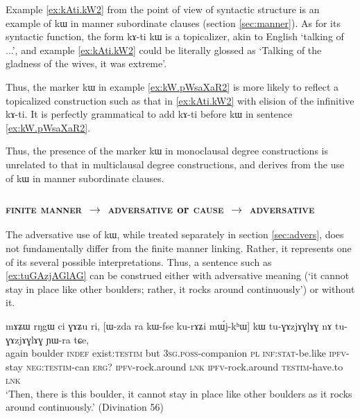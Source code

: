 \documentclass[oldfontcommands,oneside,a4paper,11pt]{article}
\newcommand{\ipa}[1]{{\phon #1}} %
\begin{document}
Example \ref{ex:kAti.kW2}  from the point of view of syntactic structure is an example of \ipa{kɯ} in manner subordinate clauses (section \ref{sec:manner}). As for its syntactic function, the form \ipa{kɤ-ti kɯ} is a topicalizer, akin to English  `talking of ...', and example \ref{ex:kAti.kW2}  could be literally glossed as `Talking of the gladness of the wives, it was extreme'. 
 
Thus, the marker \ipa{kɯ} in example \ref{ex:kW.pWsaXaR2}  is more likely to reflect a topicalized construction such as that in \ref{ex:kAti.kW2}  with elision of the infinitive \ipa{kɤ-ti}. It is perfectly grammatical to add \ipa{kɤ-ti} before \ipa{kɯ} in sentence \ref{ex:kW.pWsaXaR2}. 

Thus, the presence of the marker \ipa{kɯ} in monoclausal degree constructions is unrelated to that in multiclausal degree constructions, and derives from the use of \ipa{kɯ} in manner subordinate clauses. 


 \subsubsection{\textsc{finite manner} $\rightarrow$ \textsc{adversative} or \textsc{cause} $\rightarrow$ \textsc{adversative} }
 
The adversative use of \ipa{kɯ}, while treated separately  in section \ref{sec:advers}, does not fundamentally  differ from the finite manner linking. Rather, it represents one of its several possible interpretations. Thus, a sentence such as  \ref{ex:tuGAzjAGlAG} can be construed either with adversative meaning (`it cannot stay in place like other boulders; rather, it rocks around continuously') or without it.
 
 \begin{exe}
\ex \label{ex:tuGAzjAGlAG}
\gll  
    \ipa{mɤʑɯ}  	\ipa{rŋgɯ}  	\ipa{ci}  	\ipa{ɣɤʑu}  	\ipa{ri,}  	[\ipa{ɯ-zda}  	\ipa{ra}  	\ipa{kɯ-fse}  	\ipa{ku-rɤʑi}  	\ipa{mɯ́j-kʰɯ}]  	\ipa{kɯ}  	\ipa{tu-ɣɤzjɤɣlɤɣ}  	\ipa{nɤ}  	\ipa{tu-ɣɤzjɤɣlɤɣ}  	\ipa{ɲɯ-ra}  	\ipa{tɕe,}  \\
    again boulder \textsc{indef} exist:\textsc{testim} but \textsc{3sg.poss}-companion \textsc{pl} \textsc{inf:stat}-be.like \textsc{ipfv}-stay \textsc{neg:testim}-can \textsc{erg}? \textsc{ipfv}-rock.around \textsc{lnk} \textsc{ipfv}-rock.around  \textsc{testim}-have.to \textsc{lnk}     \\
   \glt `Then, there is this boulder, it cannot stay in place like other boulders as it rocks around continuously.' (Divination  56)
 \end{exe}
 
\end{document}

